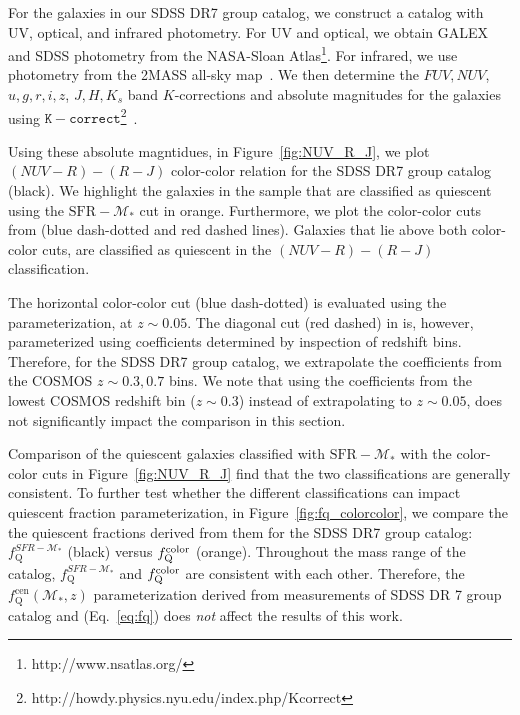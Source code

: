 \documentclass[iop,apj,tighten,twocolappendix,numberedappendix]{emulateapj}
\newcommand{\fq}{f_\mathrm{Q}}
\newcommand{\fqcen}{f_\mathrm{Q}^\mathrm{cen}}
\begin{document}
For the galaxies in our SDSS DR7 group catalog, we construct a catalog
with UV, optical, and infrared photometry. For UV and optical, 
we obtain GALEX and SDSS photometry from the NASA-Sloan Atlas\footnote{http://www.nsatlas.org/}.
For infrared, we use photometry from the 2MASS all-sky map~\citep{Cutri:2000aa}. 
We then determine the $FUV, NUV$, $u, g, r, i, z$, $J, H, K_s$ 
band $K$-corrections and absolute magnitudes for the galaxies 
using $\mathtt{K-correct}$\footnote{http://howdy.physics.nyu.edu/index.php/Kcorrect}~\citep[v4.2][]{Blanton:2007aa}. 

Using these absolute magntidues, in Figure~\ref{fig:NUV_R_J}, we 
plot $(NUV-R) - (R-J)$ color-color relation for the SDSS DR7 group 
catalog (black). We highlight the galaxies in the sample that are 
classified as quiescent using the $\mathrm{SFR} - \mathcal{M}_*$
cut in orange. Furthermore, we plot the color-color cuts from 
\cite{Bundy:2010aa} (blue dash-dotted and red dashed lines). 
Galaxies that lie above both color-color cuts, are classified as 
quiescent in the $(NUV-R) - (R-J)$ classification. 

The horizontal color-color cut (blue dash-dotted) is evaluated
using the \cite{Bundy:2010aa} parameterization, at $z \sim 0.05$. The 
diagonal cut (red dashed) in \cite{Bundy:2010aa} is, however, 
parameterized using coefficients determined by inspection of 
redshift bins. Therefore, for the SDSS DR7 group catalog, we 
extrapolate the coefficients from the COSMOS $z \sim 0.3, 0.7$ 
bins. We note that using the coefficients from the lowest COSMOS 
redshift bin ($z \sim 0.3$) instead of extrapolating to $z \sim 0.05$,
does not significantly impact the comparison in this section. 

Comparison of the quiescent galaxies classified with $\mathrm{SFR} - \mathcal{M}_*$ 
with the color-color cuts in Figure~\ref{fig:NUV_R_J} find that
the two classifications are generally consistent. To further 
test whether the different classifications can impact quiescent
fraction parameterization, in Figure~\ref{fig:fq_colorcolor}, we 
compare the the quiescent fractions derived from them for the 
SDSS DR7 group catalog: $\fq^{SFR-\mathcal{M}_*}$ (black) versus 
$\fq^{\rm color}$ (orange). Throughout the mass range of the 
catalog, $\fq^{SFR-\mathcal{M}_*}$ and $\fq^{\rm color}$ are 
consistent with each other. Therefore, the $\fqcen(\mathcal{M}_*, z)$ 
parameterization derived from measurements of SDSS DR 7 group catalog 
and \cite{Tinker:2013aa} (Eq.~\ref{eq:fq}) does {\em not} affect the 
results of this work.
\end{document}
